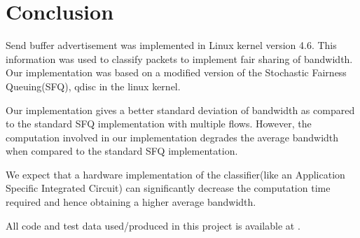 \chapter{Conclusion}

Send buffer advertisement was implemented in Linux kernel version 4.6. This
information was used to classify packets to implement fair sharing of
bandwidth. Our implementation was based on a modified version of the Stochastic
Fairness Queuing(SFQ), qdisc in the linux kernel.

Our implementation gives a better standard deviation of bandwidth as compared to
the standard SFQ implementation with multiple flows. However, the computation
involved in our implementation degrades the average bandwidth when compared to
the standard SFQ implementation.

We expect that a hardware implementation of the classifier(like an Application
Specific Integrated Circuit) can significantly
decrease the computation time required and hence obtaining a higher average
bandwidth.

All code and test data used/produced in this project is available at
\cite{github}.
